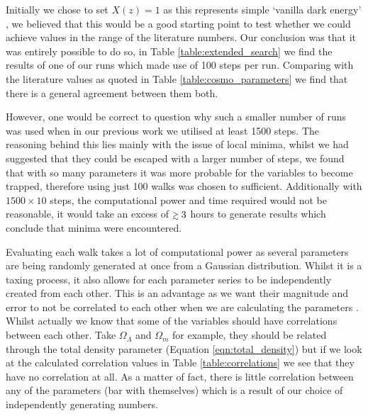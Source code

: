 \documentclass[twocolumn]{revtex4}
\begin{document}
{{Initially we chose to set $X(z)=1$ as this represents simple `vanilla dark energy' \cite{cosmo_constraints}, we believed that this would be a good starting point to test whether we could achieve values in the range of the literature numbers. Our conclusion was that it was entirely possible to do so, in Table \ref{table:extended_search} we find the results of one of our runs which made use of 100 steps per run. Comparing with the literature values as quoted in Table \ref{table:cosmo_parameters} we find that there is a general agreement between them both. 

However, one would be correct to question why such a smaller number of runs was used when in our previous work we utilised at least 1500 steps. The reasoning behind this lies mainly with the issue of local minima, whilst we had suggested that they could be escaped with a larger number of steps, we found that with so many parameters it was more probable for the variables to become trapped, therefore using just 100 walks was chosen to sufficient. Additionally with $1500\times10$ steps, the computational power and time required would not be reasonable, it would take an excess of $\mathrel{\mathsmaller{\gtrsim}} 3$ hours to generate results which conclude that minima were encountered.

Evaluating each walk takes a lot of computational power as several parameters are being randomly generated at once from a Gaussian distribution. Whilst it is a taxing process, it also allows for each parameter series to be independently created from each other. This is an advantage as we want their magnitude and error to not be correlated to each other when we are calculating the parameters \cite{hugheshase}. Whilst actually we know that some of the variables should have correlations between each other. Take $\Omega_\Lambda$ and $\Omega_m$ for example, they should be related through the total density parameter (Equation \ref{eqn:total_density}) but if we look at the calculated correlation values in Table \ref{table:correlations} we see that they have no correlation at all. As a matter of fact, there is little correlation between any of the parameters (bar with themselves) which is a result of our choice of independently generating numbers. 


}}
\end{document}
